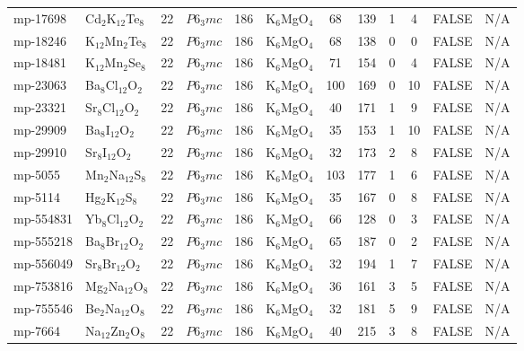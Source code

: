 {\begin{longtable}{llcccccccccc}
    mp-17698 & Cd$_{2}$K$_{12}$Te$_{8}$ & 22    & $P6_3mc$ & 186   & K$_{6}$MgO$_{4}$ & 68    & 139   & 1     & 4     & FALSE & N/A \\
    mp-18246 & K$_{12}$Mn$_{2}$Te$_{8}$ & 22    & $P6_3mc$ & 186   & K$_{6}$MgO$_{4}$ & 68    & 138   & 0     & 0     & FALSE & N/A \\
    mp-18481 & K$_{12}$Mn$_{2}$Se$_{8}$ & 22    & $P6_3mc$ & 186   & K$_{6}$MgO$_{4}$ & 71    & 154   & 0     & 4     & FALSE & N/A \\
    mp-23063 & Ba$_{8}$Cl$_{12}$O$_{2}$ & 22    & $P6_3mc$ & 186   & K$_{6}$MgO$_{4}$ & 100   & 169   & 0     & 10    & FALSE & N/A \\
    mp-23321 & Sr$_{8}$Cl$_{12}$O$_{2}$ & 22    & $P6_3mc$ & 186   & K$_{6}$MgO$_{4}$ & 40    & 171   & 1     & 9     & FALSE & N/A \\
    mp-29909 & Ba$_{8}$I$_{12}$O$_{2}$ & 22    & $P6_3mc$ & 186   & K$_{6}$MgO$_{4}$ & 35    & 153   & 1     & 10    & FALSE & N/A \\
    mp-29910 & Sr$_{8}$I$_{12}$O$_{2}$ & 22    & $P6_3mc$ & 186   & K$_{6}$MgO$_{4}$ & 32    & 173   & 2     & 8     & FALSE & N/A \\
    mp-5055 & Mn$_{2}$Na$_{12}$S$_{8}$ & 22    & $P6_3mc$ & 186   & K$_{6}$MgO$_{4}$ & 103   & 177   & 1     & 6     & FALSE & N/A \\
    mp-5114 & Hg$_{2}$K$_{12}$S$_{8}$ & 22    & $P6_3mc$ & 186   & K$_{6}$MgO$_{4}$ & 35    & 167   & 0     & 8     & FALSE & N/A \\
    mp-554831 & Yb$_{8}$Cl$_{12}$O$_{2}$ & 22    & $P6_3mc$ & 186   & K$_{6}$MgO$_{4}$ & 66    & 128   & 0     & 3     & FALSE & N/A \\
    mp-555218 & Ba$_{8}$Br$_{12}$O$_{2}$ & 22    & $P6_3mc$ & 186   & K$_{6}$MgO$_{4}$ & 65    & 187   & 0     & 2     & FALSE & N/A \\
    mp-556049 & Sr$_{8}$Br$_{12}$O$_{2}$ & 22    & $P6_3mc$ & 186   & K$_{6}$MgO$_{4}$ & 32    & 194   & 1     & 7     & FALSE & N/A \\
    mp-753816 & Mg$_{2}$Na$_{12}$O$_{8}$ & 22    & $P6_3mc$ & 186   & K$_{6}$MgO$_{4}$ & 36    & 161   & 3     & 5     & FALSE & N/A \\
    mp-755546 & Be$_{2}$Na$_{12}$O$_{8}$ & 22    & $P6_3mc$ & 186   & K$_{6}$MgO$_{4}$ & 32    & 181   & 5     & 9     & FALSE & N/A \\
    mp-7664 & Na$_{12}$Zn$_{2}$O$_{8}$ & 22    & $P6_3mc$ & 186   & K$_{6}$MgO$_{4}$ & 40    & 215   & 3     & 8     & FALSE & N/A \\

\end{longtable}}

